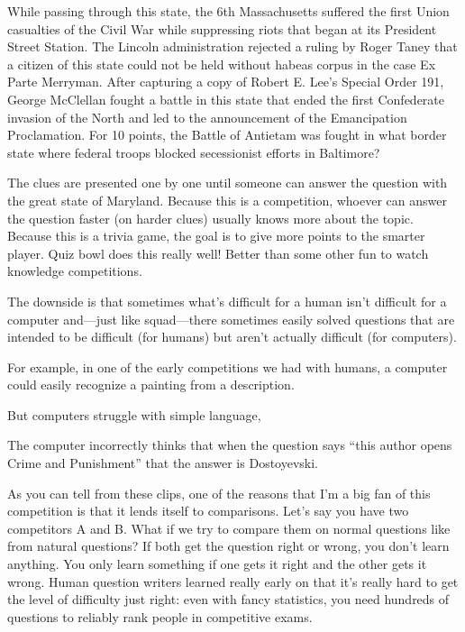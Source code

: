 While passing through this state, the 6th Massachusetts
suffered the first Union casualties of the Civil War while
suppressing riots that began at its President Street
Station. The Lincoln administration rejected a ruling by
Roger Taney that a citizen of this state could not
be held without habeas corpus in the case Ex Parte
Merryman. After capturing a copy of Robert E. Lee’s
Special Order 191, George McClellan fought a battle in
this state that ended the first Confederate invasion of
the North and led to the announcement of the
Emancipation Proclamation. For 10 points, the Battle of
Antietam was fought in what border state where federal
troops blocked secessionist efforts in Baltimore?



The clues are presented one by one until someone can answer the question with the great state of Maryland. Because this is a competition, whoever can answer the question faster (on harder clues) usually knows more about the topic.  Because this is a trivia game, the goal is to give more points to the smarter player.  Quiz bowl does this really well!  Better than some other fun to watch knowledge competitions.

The downside is that sometimes what's difficult for a human isn't difficult for a computer and—just like squad—there sometimes easily solved questions that are intended to be difficult (for humans) but aren't actually difficult (for computers).  

For example, in one of the early competitions we had with humans, a computer could easily recognize a painting from a description. 

But computers struggle with simple language, 

The computer incorrectly thinks that when the question says “this author opens Crime and Punishment” that the answer is Dostoyevski.

As you can tell from these clips, one of the reasons that I’m a big fan of this competition is that it lends itself to comparisons. Let’s say you have two competitors A and B. What if we try to compare them on normal questions like from natural questions? If both get the question right or wrong, you don’t learn anything. You only learn something if one gets it right and the other gets it wrong. Human question writers learned really early on that it’s really hard to get the level of difficulty just right: even with fancy statistics, you need hundreds of questions to reliably rank people in competitive exams.

